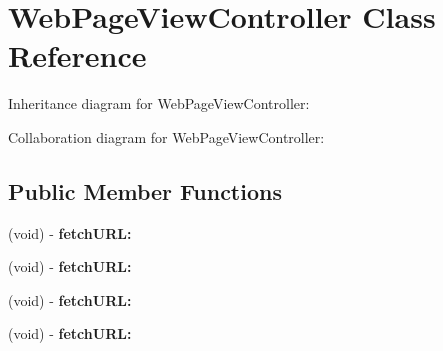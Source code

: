 \hypertarget{interface_web_page_view_controller}{
\section{\-Web\-Page\-View\-Controller \-Class \-Reference}
\label{interface_web_page_view_controller}
}


\-Inheritance diagram for \-Web\-Page\-View\-Controller\-:


\-Collaboration diagram for \-Web\-Page\-View\-Controller\-:
\subsection*{\-Public \-Member \-Functions}
\begin{DoxyCompactItemize}
\item 
\hypertarget{interface_web_page_view_controller_a8f63fa7e4fc510b58e8102fa0434d639}{
(void) -\/ {\bfseries fetch\-U\-R\-L\-:}}
\label{interface_web_page_view_controller_a8f63fa7e4fc510b58e8102fa0434d639}

\item 
\hypertarget{interface_web_page_view_controller_a8f63fa7e4fc510b58e8102fa0434d639}{
(void) -\/ {\bfseries fetch\-U\-R\-L\-:}}
\label{interface_web_page_view_controller_a8f63fa7e4fc510b58e8102fa0434d639}

\item 
\hypertarget{interface_web_page_view_controller_a8f63fa7e4fc510b58e8102fa0434d639}{
(void) -\/ {\bfseries fetch\-U\-R\-L\-:}}
\label{interface_web_page_view_controller_a8f63fa7e4fc510b58e8102fa0434d639}

\item 
\hypertarget{interface_web_page_view_controller_a8f63fa7e4fc510b58e8102fa0434d639}{
(void) -\/ {\bfseries fetch\-U\-R\-L\-:}}
\label{interface_web_page_view_controller_a8f63fa7e4fc510b58e8102fa0434d639}

\end{DoxyCompactItemize}

